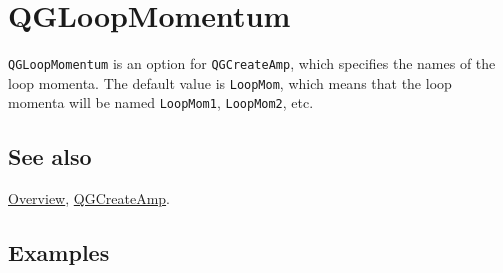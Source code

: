 \documentclass[../FeynHelpersManual.tex]{subfiles}
\begin{document}
\hypertarget{qgloopmomentum}{
\section{QGLoopMomentum}\label{qgloopmomentum}}

\texttt{QGLoopMomentum} is an option for \texttt{QGCreateAmp}, which
specifies the names of the loop momenta. The default value is
\texttt{LoopMom}, which means that the loop momenta will be named
\texttt{LoopMom1}, \texttt{LoopMom2}, etc.

\subsection{See also}

\hyperlink{toc}{Overview}, \hyperlink{qgcreateamp}{QGCreateAmp}.

\subsection{Examples}
\end{document}
